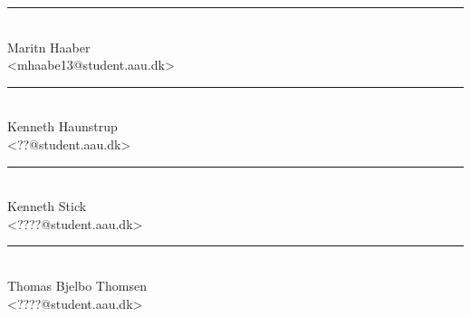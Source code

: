 \newcommand{\doublesignature}[4]{
    \noindent
    \begin{minipage}[b]{0.45\textwidth}
        \centering
        \rule{\textwidth}{0.5pt}\\
        #1\\
        {\footnotesize <#2@student.aau.dk>}
    \end{minipage}
    \hfill
    \begin{minipage}[b]{0.45\textwidth}
        \centering
        \rule{\textwidth}{0.5pt}\\
        #3\\
        {\footnotesize <#4@student.aau.dk>}
        \end{minipage}
    \vspace{4\baselineskip}

}

\begin{titlepage}
    \vspace*{\fill}
    \doublesignature{Maritn Haaber}{mhaabe13}{Kenneth Haunstrup}{??}
    \doublesignature{Kenneth Stick}{????}{Thomas Bjelbo Thomsen}{????}
\end{titlepage}